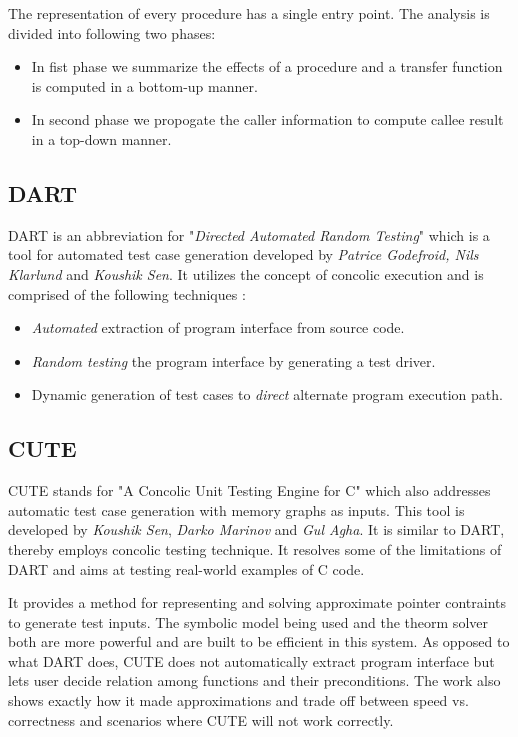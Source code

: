 \documentclass[12pt,oneside]{book}
\begin{document}
The representation of every procedure has a single entry point. The analysis is divided into following two phases:
\begin{itemize}
  \item In fist phase we summarize the effects of a procedure and a transfer function is computed in a bottom-up manner.
  \item  In second phase we propogate the caller information to compute callee result in a top-down manner.
\end{itemize}


\subsection {DART}
DART is an abbreviation for "\textit{Directed Automated Random Testing}"\cite{dart} which is a tool for automated test case generation developed by \textit{Patrice Godefroid, Nils Klarlund} and \textit{Koushik Sen}. It utilizes the concept of concolic execution and is comprised of the following techniques :
\begin{itemize}
 \item \textit{Automated} extraction of program interface from source code.
 \item \textit{Random testing} the program interface by generating a test driver. 
 \item Dynamic generation of test cases to \textit{direct} alternate program execution path.
\end{itemize}

\newpage


\subsection{CUTE}
CUTE stands for "A Concolic Unit Testing Engine for C"\cite{cute} which also addresses automatic test case generation with memory graphs as inputs. This tool is developed by \textit{Koushik Sen}, \textit{Darko Marinov} and \textit{Gul Agha}. It is similar to DART, thereby employs concolic testing technique. It resolves some of the limitations of DART and aims at testing real-world examples of C code.

It provides a method for representing and solving approximate pointer contraints to generate test inputs. The symbolic model being used and the theorm solver both are more powerful and are built to be efficient in this system. As opposed to what DART does, CUTE does not automatically extract program interface but lets user decide relation among functions and their preconditions. The work also shows exactly how it made approximations and trade off between speed vs. correctness and scenarios where CUTE will not work correctly.
\end{document}
